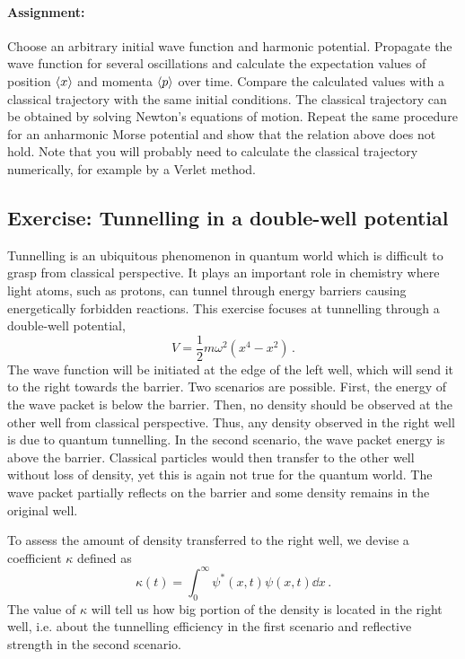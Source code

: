\paragraph{Assignment:} Choose an arbitrary initial wave function and harmonic potential. Propagate the wave function for several oscillations and calculate the expectation values of position $\braket{x}$ and momenta $\braket{p}$ over time. Compare the calculated values with a classical trajectory with the same initial conditions. The classical trajectory can be obtained by solving Newton's equations of motion. Repeat the same procedure for an anharmonic Morse potential and show that the relation above does not hold. Note that you will probably need to calculate the classical trajectory numerically, for example by a Verlet method.


\subsection*{Exercise: Tunnelling in a double-well potential}

Tunnelling is an ubiquitous phenomenon in quantum world which is difficult to grasp from classical perspective. It plays an important role in chemistry where light atoms, such as protons, can tunnel through energy barriers causing energetically forbidden reactions. This exercise focuses at tunnelling through a double-well potential,
\begin{equation*}
    V = \frac{1}{2}m\omega^2(x^4 - x^2) \, .
\end{equation*}
The wave function will be initiated at the edge of the left well, which will send it to the right towards the barrier. Two scenarios are possible. First, the energy of the wave packet is below the barrier. Then, no density should be observed at the other well from classical perspective. Thus, any density observed in the right well is due to quantum tunnelling. In the second scenario, the wave packet energy is above the barrier. Classical particles would then transfer to the other well without loss of density, yet this is again not true for the quantum world. The wave packet partially reflects on the barrier and some density remains in the original well.

To assess the amount of density transferred to the right well, we devise a coefficient $\kappa$ defined as
\begin{equation*}
    \kappa(t) = \int_0^{\infty} \psi^*(x,t) \psi(x,t) \dd x \,.
\end{equation*}
The value of $\kappa$ will tell us how big portion of the density is located in the right well, i.e. about the tunnelling efficiency in the first scenario and reflective strength in the second scenario.

